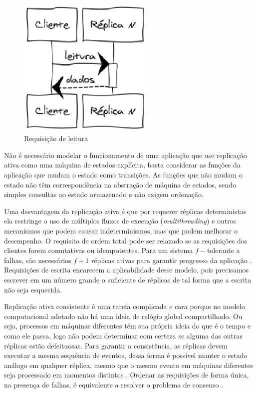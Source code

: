 \begin{figure}[htbp]
  \centering
  \includegraphics[width=6.5cm]{conteudo/capitulos/figuras/leitura_replicacao.eps}
  \caption{Requisição de leitura}
  \label{fig:read-replication}
\end{figure}

Não é necessário modelar o funcionamento de uma aplicação que use replicação ativa como
uma máquina de estados explícita, basta considerar as funções da aplicação que mudam o
estado como transições. As funções que não mudam o estado não têm correspondência na
abstração de máquina de estados, sendo simples consultas ao estado armazenado e não exigem
ordenação.

Uma desvantagem da replicação ativa é que por requerer réplicas deterministas ela
restringe o uso de múltiplos fluxos de execução (\emph{multithreading}) e outros
mecanismos que podem causar indeterminismos, mas que podem melhorar o desempenho. O
requisito de ordem total pode ser relaxado se as requisições dos clientes forem
comutativas ou idempotentes. Para um sistema $f-$tolerante a falhas, são necessários $f +
1$ réplicas ativas para garantir progresso da aplicação \cite{jalote94, lamport10}.
Requisições de escrita encarecem a aplicabilidade desse modelo, pois precisamos escrever
em um número grande o suficiente de réplicas de tal forma que a escrita não seja
esquecida.

Replicação ativa consistente é uma tarefa complicada e cara porque no modelo computacional
adotado não há uma ideia de relógio global compartilhado. Ou seja, processos em máquinas
diferentes têm sua própria ideia do que é o tempo e como ele passa, logo não podem
determinar com certeza se alguma das outras réplicas estão defeituosas. Para garantir a
consistência, as réplicas devem executar a mesma sequência de eventos, dessa forma é
possível manter o estado análogo em qualquer réplica, mesmo que o mesmo evento em máquinas
diferentes seja processado em momentos distintos \cite{tanenbaum07}. Ordenar as
requisições de forma única, na presença de falhas, é equivalente a resolver o problema de
consenso \cite{chandra96}.


